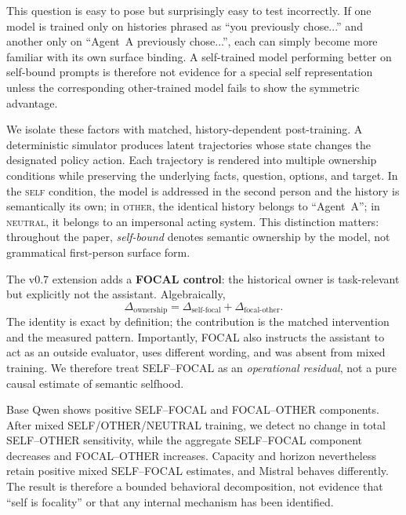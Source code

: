\documentclass{article}
\begin{document}
This question is easy to pose but surprisingly easy to test incorrectly. If one model is trained only on histories phrased as ``you previously chose...'' and another only on ``Agent~A previously chose...'', each can simply become more familiar with its own surface binding. A self-trained model performing better on self-bound prompts is therefore not evidence for a special self representation unless the corresponding other-trained model fails to show the symmetric advantage.

We isolate these factors with matched, history-dependent post-training. A deterministic simulator produces latent trajectories whose state changes the designated policy action. Each trajectory is rendered into multiple ownership conditions while preserving the underlying facts, question, options, and target. In the \textsc{self} condition, the model is addressed in the second person and the history is semantically its own; in \textsc{other}, the identical history belongs to ``Agent~A''; in \textsc{neutral}, it belongs to an impersonal acting system. This distinction matters: throughout the paper, \emph{self-bound} denotes semantic ownership by the model, not grammatical first-person surface form.

The v0.7 extension adds a \textbf{FOCAL control}: the historical owner is task-relevant but explicitly not the assistant. Algebraically,
\begin{equation}
\label{eq:decomp}
\Delta_{\mathrm{ownership}}=\Delta_{\mathrm{self\text{-}focal}}+\Delta_{\mathrm{focal\text{-}other}}.
\end{equation}
The identity is exact by definition; the contribution is the matched intervention and the measured pattern. Importantly, FOCAL also instructs the assistant to act as an outside evaluator, uses different wording, and was absent from mixed training. We therefore treat SELF--FOCAL as an \emph{operational residual}, not a pure causal estimate of semantic selfhood.

Base Qwen shows positive SELF--FOCAL and FOCAL--OTHER components. After mixed SELF/OTHER/NEUTRAL training, we detect no change in total SELF--OTHER sensitivity, while the aggregate SELF--FOCAL component decreases and FOCAL--OTHER increases. Capacity and horizon nevertheless retain positive mixed SELF--FOCAL estimates, and Mistral behaves differently. The result is therefore a bounded behavioral decomposition, not evidence that ``self is focality'' or that any internal mechanism has been identified.
\end{document}
